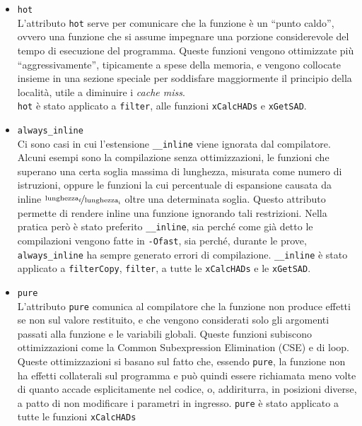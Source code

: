 \begin{itemize}
	\item\verb|hot|\\
	L'attributo \verb|hot| serve per comunicare che la funzione è un ``punto 
	caldo'', ovvero una funzione che si assume impegnare una 
	porzione considerevole del tempo di esecuzione del programma.
	Queste funzioni vengono ottimizzate più ``aggressivamente'', tipicamente a 
	spese della memoria, e vengono collocate insieme in una sezione speciale 
	per soddisfare maggiormente il principio della località, utile a diminuire 
	i \emph{cache miss}.\\
	\verb|hot| è stato applicato a \verb|filter|, alle funzioni 
	\verb|xCalcHADs| e \verb|xGetSAD|.
	
	\item\verb|always_inline|\\
	Ci sono casi in cui l'estensione \verb|__inline| viene ignorata dal 
	compilatore. Alcuni esempi sono la compilazione senza ottimizzazioni, le 
	funzioni che superano una certa soglia massima di lunghezza, misurata come 
	numero di istruzioni, oppure le funzioni la cui percentuale di espansione 
	causata da inline 
	$\nicefrac{\text{lunghezza}_\text{f}}{\text{lunghezza}_\text{i}}$ 
	 oltre una determinata soglia.
	Questo attributo permette di rendere inline una funzione ignorando tali 
	restrizioni. Nella pratica però è stato preferito \verb|__inline|, sia 
	perché come già detto le compilazioni vengono fatte in \verb|-Ofast|, sia 
	perché, durante le prove, \verb|always_inline| ha sempre generato errori di 
	compilazione. \verb|__inline| è stato applicato a \verb|filterCopy|, 
	\verb|filter|, a 
	tutte le \verb|xCalcHADs| e le \verb|xGetSAD|.

	\item\verb|pure|\\
	L'attributo \verb|pure| comunica al compilatore che la funzione non produce 
	effetti se non sul valore restituito, e che vengono considerati solo gli 
	argomenti passati alla funzione e le variabili globali. Queste funzioni 
	subiscono ottimizzazioni come la Common Subexpression Elimination (CSE) e 
	di loop. Queste ottimizzazioni si basano sul fatto 
	che, essendo \verb|pure|, la funzione non ha effetti collaterali sul 
	programma e 
	può quindi essere richiamata meno volte di quanto accade esplicitamente nel 
	codice, o, addiriturra, in posizioni diverse, a patto di non modificare i 
	parametri in ingresso. \verb|pure| è stato applicato a tutte le 
	funzioni \verb|xCalcHADs|
	

\end{itemize}
